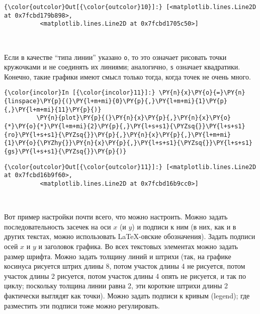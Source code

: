             \begin{Verbatim}[commandchars=\\\{\}]
{\color{outcolor}Out[{\color{outcolor}10}]:} [<matplotlib.lines.Line2D at 0x7fcbd179b898>,
          <matplotlib.lines.Line2D at 0x7fcbd1705c50>]
\end{Verbatim}
        
    \begin{center}
    \end{center}
    { \hspace*{\fill} \\}
    
    Если в качестве ``типа линии'' указано
\texttt{\textquotesingle{}o\textquotesingle{}}, то это означает рисовать
точки кружочками и не соединять их линиями; аналогично,
\texttt{\textquotesingle{}s\textquotesingle{}} означает квадратики.
Конечно, такие графики имеют смысл только тогда, когда точек не очень
много.

    \begin{Verbatim}[commandchars=\\\{\}]
{\color{incolor}In [{\color{incolor}11}]:} \PY{n}{x}\PY{o}{=}\PY{n}{linspace}\PY{p}{(}\PY{l+m+mi}{0}\PY{p}{,}\PY{l+m+mi}{1}\PY{p}{,}\PY{l+m+mi}{11}\PY{p}{)}
         \PY{n}{plot}\PY{p}{(}\PY{n}{x}\PY{p}{,}\PY{n}{x}\PY{o}{*}\PY{o}{*}\PY{l+m+mi}{2}\PY{p}{,}\PY{l+s+s1}{\PYZsq{}}\PY{l+s+s1}{ro}\PY{l+s+s1}{\PYZsq{}}\PY{p}{,}\PY{n}{x}\PY{p}{,}\PY{l+m+mi}{1}\PY{o}{\PYZhy{}}\PY{n}{x}\PY{p}{,}\PY{l+s+s1}{\PYZsq{}}\PY{l+s+s1}{gs}\PY{l+s+s1}{\PYZsq{}}\PY{p}{)}
\end{Verbatim}

            \begin{Verbatim}[commandchars=\\\{\}]
{\color{outcolor}Out[{\color{outcolor}11}]:} [<matplotlib.lines.Line2D at 0x7fcbd16b9f60>,
          <matplotlib.lines.Line2D at 0x7fcbd16b9cc0>]
\end{Verbatim}
        
    \begin{center}
    \end{center}
    { \hspace*{\fill} \\}
    
    Вот пример настройки почти всего, что можно настроить. Можно задать
последовательность засечек на оси \(x\) (и \(y\)) и подписи к ним (в
них, как и в других текстах, можно использовать \LaTeX-овские
обозначения). Задать подписи осей \(x\) и \(y\) и заголовок графика. Во
всех текстовых элементах можно задать размер шрифта. Можно задать
толщину линий и штрихи (так, на графике косинуса рисуется штрих длины 8,
потом участок длины 4 не рисуется, потом участок длины 2 рисуется, потом
участок длины 4 опять не рисуется, и так по циклу; поскольку толщина
линии равна 2, эти короткие штрихи длины 2 фактически выглядят как
точки). Можно задать подписи к кривым (legend); где разместить эти
подписи тоже можно регулировать.

